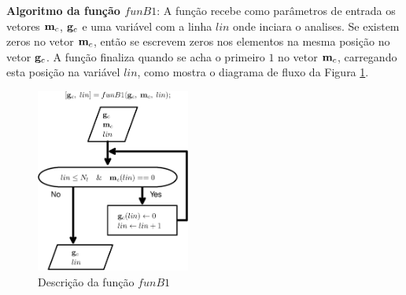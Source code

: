 \textbf{Algoritmo da função $funB1$}:
A função recebe como parâmetros de entrada os vetores $\VECTOR{m}_{c}$, $\VECTOR{g}_{c}$
e uma variável com a linha $lin$ onde inciara o analises.
Se existem zeros no vetor $\VECTOR{m}_{c}$, então se escrevem zeros nos elementos na mesma posição 
no vetor $\VECTOR{g}_{c}$.
A função finaliza quando se acha o primeiro $1$ no vetor $\VECTOR{m}_{c}$,
carregando esta posição na variável $lin$, 
como mostra o diagrama de fluxo da Figura \ref{fig:funB1}.
\begin{figure}[!htb]
\centering
\includegraphics[width=0.45\textwidth]{section-cumulos/funB1.eps}
\caption{Descrição da função $funB1$ }
\label{fig:funB1}
\end{figure}

